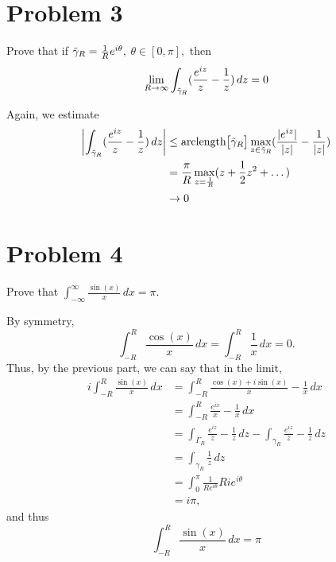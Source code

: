 \documentclass[11pt]{article}
\begin{document}
\section*{Problem 3}
\begin{problem}
    Prove that if $\Tilde{\gamma}_R = \frac{1}{R}e^{i\theta},$ $\theta \in [0, \pi],$ then 
    \[\lim_{R\to \infty} \int_{\Tilde{\gamma}_R}(\frac{e^{iz}}{z} - \frac{1}{z}) \, dz = 0 \]
\end{problem}
\begin{solution}
    Again, we estimate
    \begin{align*}
      \left|\int_{\Tilde{\gamma}_R}(\frac{e^{iz}}{z} - \frac{1}{z}) \, dz\right|  &\leq \text{arclength}\big[\Tilde{\gamma}_R\big]\max_{z \in \Tilde{\gamma}_R}(\frac{|e^{iz}|}{|z|} - \frac{1}{|z|})\\
      &= \frac{\pi}{R} \max_{z = \frac{1}{R}}(z + \frac{1}{2}z^2 + \dots)\\
      &\to 0
    \end{align*}
\end{solution}

\newpage
\section*{Problem 4}
\begin{problem}
    Prove that $\int_{-\infty}^\infty \frac{\sin(x)}{x}\, dx = \pi.$
\end{problem}
\begin{solution}
By symmetry, 
\[\int_{-R}^R \frac{\cos(x)}{x}\,dx =  \int_{-R}^R \frac{1}{x}\, dx = 0.\] Thus, by the previous part, we can say that in the limit,
\begin{align*}
    i\int_{-R}^R \frac{\sin(x)}{x}\, dx &= \int_{-R}^R \frac{\cos(x) + i\sin(x)}{x}- \frac{1}{x}\, dx\\
    &= \int_{-R}^R \frac{e^{ix}}{x} - \frac{1}{x}\, dx\\
    &= \int_{\Gamma_R}\frac{e^{iz}}{z} - \frac{1}{z}\, dz - \int_{\gamma_R}\frac{e^{iz}}{z} - \frac{1}{z}\, dz\\
    &= \int_{\gamma_R} \frac{1}{z}\,dz\\
    &= \int_0^\pi \frac{1}{Re^{i\theta}}Rie^{i\theta}\\
    &= i\pi,
\end{align*}
and thus 
\[\int_{-R}^R \frac{\sin(x)}{x}\, dx = \pi\]
    
\end{solution}

\newpage
\end{document}
